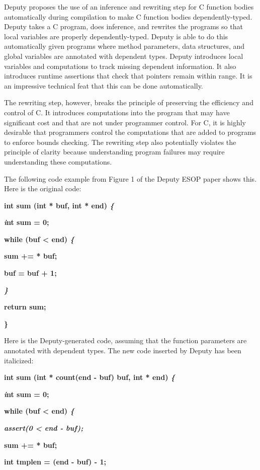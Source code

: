 \documentclass[]{article}
\begin{document}
Deputy proposes the use of an inference and rewriting step for C
function bodies automatically during compilation to make C function
bodies dependently-typed. Deputy takes a C program, does inference, and
rewrites the programs so that local variables are properly
dependently-typed. Deputy is able to do this automatically given
programs where method parameters, data structures, and global variables
are annotated with dependent types. Deputy introduces local variables
and computations to track missing dependent information. It also
introduces runtime assertions that check that pointers remain within
range. It is an impressive technical feat that this can be done
automatically.

The rewriting step, however, breaks the principle of preserving the
efficiency and control of C. It introduces computations into the program
that may have significant cost and that are not under programmer
control. For C, it is highly desirable that programmers control the
computations that are added to programs to enforce bounds checking. The
rewriting step also potentially violates the principle of clarity
because understanding program failures may require understanding these
computations.

The following code example from Figure 1 of the Deputy ESOP paper shows
this. Here is the original code:

\textbf{int sum (int * buf, int * end) \emph{\{}}

\textbf{\emph{i}nt sum = 0;}

\textbf{while (buf \textless{} end) \emph{\{}}

\textbf{sum += * buf;}

\textbf{buf = buf + 1;}

\emph{\textbf{\}}}

\textbf{return sum;}

\textbf{\}}

Here is the Deputy-generated code, assuming that the function parameters
are annotated with dependent types. The new code inserted by Deputy has
been italicized:

\textbf{int sum (int * count(end - buf) buf, int * end) \emph{\{}}

\textbf{\emph{i}nt sum = 0;}

\textbf{while (buf \textless{} end) \emph{\{}}

\emph{\textbf{assert(0 \textless{} end - buf);}}

\textbf{sum += * buf;}

\textbf{int tmplen = (end - buf) - 1;}
\end{document}
